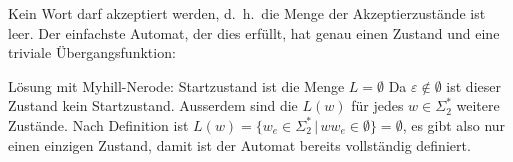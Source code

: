 \begin{loesung}
\begin{teilaufgaben}
\begin{center}
\end{center}
\item Kein Wort darf akzeptiert werden, d.~h.~die Menge der Akzeptierzustände
ist leer. Der einfachste Automat, der dies erfüllt, hat genau einen
Zustand und eine triviale Übergangsfunktion:
\begin{center}
\end{center}
Lösung mit Myhill-Nerode: Startzustand ist die Menge $L=\emptyset$
Da $\varepsilon\not\in\emptyset$ ist dieser Zustand kein Startzustand.
Ausserdem sind die $L(w)$ für jedes $w\in\Sigma_2^*$ weitere Zustände.
Nach Definition ist $L(w)=\{w_e\in\Sigma_2^*\,|\,ww_e\in \emptyset\}=\emptyset$,
es gibt also nur einen einzigen Zustand, damit ist der Automat bereits
vollständig definiert.
\qedhere
\end{teilaufgaben}
\end{loesung}

